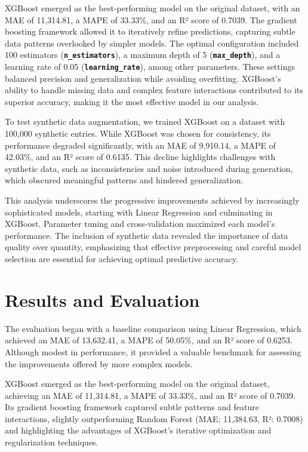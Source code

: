 \documentclass[a4paper,oneside,bibliography=totoc]{scrbook}
\begin{document}
XGBoost emerged as the best-performing model on the original dataset, with an MAE of 11,314.81, a MAPE of 33.33\%, and an R² score of 0.7039. The gradient boosting framework allowed it to iteratively refine predictions, capturing subtle data patterns overlooked by simpler models. The optimal configuration included 100 estimators (\textbf{\texttt{n\_estimators}}), a maximum depth of 5 (\textbf{\texttt{max\_depth}}), and a learning rate of 0.05 (\textbf{\texttt{learning\_rate}}), among other parameters. These settings balanced precision and generalization while avoiding overfitting. XGBoost's ability to handle missing data and complex feature interactions contributed to its superior accuracy, making it the most effective model in our analysis.

To test synthetic data augmentation, we trained XGBoost on a dataset with 100,000 synthetic entries. While XGBoost was chosen for consistency, its performance degraded significantly, with an MAE of 9,910.14, a MAPE of 42.03\%, and an R² score of 0.6135. This decline highlights challenges with synthetic data, such as inconsistencies and noise introduced during generation, which obscured meaningful patterns and hindered generalization.

This analysis underscores the progressive improvements achieved by increasingly sophisticated models, starting with Linear Regression and culminating in XGBoost. Parameter tuning and cross-validation maximized each model's performance. The inclusion of synthetic data revealed the importance of data quality over quantity, emphasizing that effective preprocessing and careful model selection are essential for achieving optimal predictive accuracy.

\chapter{Results and Evaluation}
\label{cha:resultsAndEvaluation}

The evaluation began with a baseline comparison using Linear Regression, which achieved an MAE of 13,632.41, a MAPE of 50.05\%, and an R² score of 0.6253. Although modest in performance, it provided a valuable benchmark for assessing the improvements offered by more complex models.

XGBoost emerged as the best-performing model on the original dataset, achieving an MAE of 11,314.81, a MAPE of 33.33\%, and an R² score of 0.7039. Its gradient boosting framework captured subtle patterns and feature interactions, slightly outperforming Random Forest (MAE: 11,384.63, R²: 0.7008) and highlighting the advantages of XGBoost's iterative optimization and regularization techniques.
\end{document}
